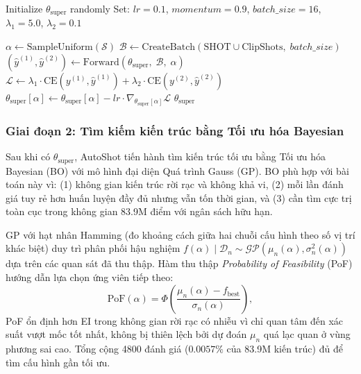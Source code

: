 \begin{algorithm}[H]
\caption{SuperNet Training (Single-Path One-Shot)}
\label{alg:supernet_training}
\begin{algorithmic}[1]
\State Initialize $\theta_{\mathrm{super}}$ randomly
\State Set: $lr = 0.1$, $momentum = 0.9$, $batch\_size = 16$, $\lambda_1 = 5.0$, $\lambda_2 = 0.1$

        \State $\alpha \gets \mathrm{SampleUniform}(\mathcal{S})$
        \State $\mathcal{B} \gets \text{CreateBatch}(\text{SHOT} \cup \text{ClipShots},\; batch\_size)$
        \State $(\hat{y}^{(1)}, \hat{y}^{(2)}) \gets \text{Forward}(\theta_{\mathrm{super}},\; \mathcal{B},\; \alpha)$
        \State $\mathcal{L} \gets \lambda_1 \cdot \mathrm{CE}(y^{(1)}, \hat{y}^{(1)}) + \lambda_2 \cdot \mathrm{CE}(y^{(2)}, \hat{y}^{(2)})$
        \State $\theta_{\mathrm{super}}[\alpha] \gets \theta_{\mathrm{super}}[\alpha] - lr \cdot \nabla_{\theta_{\mathrm{super}}[\alpha]} \mathcal{L}$
    \EndFor
\EndFor
\State \Return $\theta_{\mathrm{super}}$
\EndFunction
\end{algorithmic}
\end{algorithm}

\subsubsection{Giai đoạn 2: Tìm kiếm kiến trúc bằng Tối ưu hóa Bayesian}
\label{subsubsec:bayesian_search}

Sau khi có $\theta_{\mathrm{super}}$, AutoShot tiến hành tìm kiến trúc tối ưu bằng Tối ưu hóa Bayesian (BO) với mô hình đại diện Quá trình Gauss (GP). BO phù hợp với bài toán này vì: (1) không gian kiến trúc rời rạc và không khả vi, (2) mỗi lần đánh giá tuy rẻ hơn huấn luyện đầy đủ nhưng vẫn tốn thời gian, và (3) cần tìm cực trị toàn cục trong không gian 83.9M điểm với ngân sách hữu hạn.

GP với hạt nhân Hamming (đo khoảng cách giữa hai chuỗi cấu hình theo số vị trí khác biệt) duy trì phân phối hậu nghiệm $f(\alpha) \mid \mathcal{D}_n \sim \mathcal{GP}(\mu_n(\alpha), \sigma_n^2(\alpha))$ dựa trên các quan sát đã thu thập. Hàm thu thập \textit{Probability of Feasibility} (PoF) hướng dẫn lựa chọn ứng viên tiếp theo:
\begin{equation}
    \mathrm{PoF}(\alpha) = \Phi\!\left(\frac{\mu_n(\alpha) - f_{\mathrm{best}}}{\sigma_n(\alpha)}\right),
    \label{eq:pof}
\end{equation}
PoF ổn định hơn EI trong không gian rời rạc có nhiễu vì chỉ quan tâm đến xác suất vượt mốc tốt nhất, không bị thiên lệch bởi dự đoán $\mu_n$ quá lạc quan ở vùng phương sai cao. Tổng cộng 4800 đánh giá ($0.0057\%$ của 83.9M kiến trúc) đủ để tìm cấu hình gần tối ưu.

